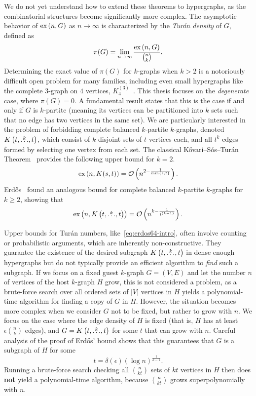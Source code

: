 We do not yet understand how to extend these theorems to hypergraphs,
as the combinatorial structures become significantly more complex.
The asymptotic behavior of $\text{ex} \left( n, G \right)$ as $n \to \infty$
is characterized by the \emph{Turán density} of $G$, defined as
\[
    \pi(G) = \lim_{n \to \infty} \frac{\text{ex} \left( n, G \right)}{\binom{n}{k}}.
\]
Determining the exact value of $\pi(G)$ for $k$-graphs when $k > 2$
is a notoriously difficult open problem for many families,
including even small hypergraphs like the complete $3$-graph on $4$ vertices,
$K_4^{(3)}$~\cite{keevash2011hypergraph, razborov20103}.
This thesis focuses on the \emph{degenerate} case, where $\pi(G) = 0$.
A fundamental result states that this is the case if and only if $G$ is $k$-partite
(meaning its vertices can be partitioned into $k$ sets such that no edge has two vertices in the same set).
We are particularly interested in the problem of forbidding complete balanced $k$-partite $k$-graphs,
denoted $K\left(t, \overset{k}{\dots}, t\right)$, which consist of $k$ disjoint sets of $t$ vertices each,
and all $t^k$ edges formed by selecting one vertex from each set.
The classical Kővari--Sós--Turán Theorem~\cite{Kovari1954, Hylten1958}
provides the following upper bound for $k=2$.
\[
    \text{ex} \left( n, K(s, t) \right) = \mathcal{O}\left(n^{2 - \frac{1}{\min\{s, t\}}}\right).
\]
Erdős~\cite{Erods1964} found an analogous bound for complete balanced $k$-partite $k$-graphs for $k \ge 2$,
showing that
\begin{equation} \label{eq:erdos64-intro}
    \text{ex} \left( n, K\left(t, \overset{k}{\dots}, t\right) \right) = \mathcal{O}\left(n^{k - \frac{1}{t^{(k-1)}}}\right).
\end{equation}

Upper bounds for Turán numbers, like~\eqref{eq:erdos64-intro},
often involve counting or probabilistic arguments,
which are inherently non-constructive.
They guarantee the existence of the desired subgraph $K\left(t, \overset{k}{\dots}, t\right)$
in dense enough hypergraphs but do not typically provide an efficient algorithm to \emph{find} such a subgraph.
If we focus on a fixed guest $k$-graph $G = (V, E)$ and let the number $n$ of vertices of the host $k$-graph $H$ grow,
this is not considered a problem,
as a brute-force search over all ordered sets of $|V|$ vertices in $H$ yields a polynomial-time algorithm
for finding a copy of $G$ in $H$.
However, the situation becomes more complex when we consider $G$ not to be fixed, but rather to grow with $n$.
We focus on the case where the edge density of $H$ is fixed (that is, $H$ has at least $\epsilon \binom{n}{k}$ edges),
and $G = K\left(t, \overset{k}{\dots}, t\right)$ for some $t$ that can grow with $n$.
Careful analysis of the proof of Erdős' bound shows that this guarantees that $G$ is a subgraph of $H$ for some
\begin{equation} \label{eq:t-lower-intro}
    t = \delta(\epsilon) (\log n)^{\frac{1}{k-1}}.
\end{equation}
Running a brute-force search checking all $\binom{n}{kt}$ sets of $kt$
vertices in $H$ then does \textbf{not} yield a polynomial-time algorithm,
because $\binom{n}{kt}$ grows superpolynomially with $n$.

